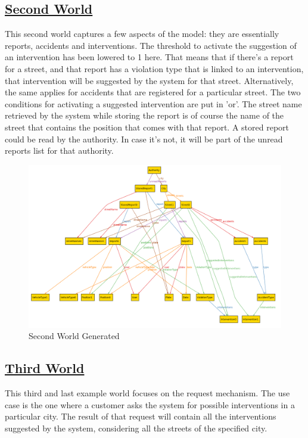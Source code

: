 	\subsection[Second World]{\hyperlink{toc}{Second World}}
	This second world captures a few aspects of the model: they are essentially reports, accidents and interventions. The threshold to activate the suggestion of an intervention has been lowered to 1 here. That means that if there's a report for a street, and that report has a violation type that is linked to an intervention, that intervention will be suggested by the system for that street. Alternatively, the same applies for accidents that are registered for a particular street. The two conditions for activating a suggested intervention are put in 'or'.
	The street name retrieved by the system while storing the report is of course the name of the street that contains the position that comes with that report.
	A stored report could be read by the authority. In case it's not, it will be part of the unread reports list for that authority.
	
	\begin{figure}[hbtp]
		\centering
		\includegraphics[scale=0.4, angle=90]{Files/alloy/world2.png}
		\caption{Second World Generated}
	\end{figure}
	
	\FloatBarrier
	\subsection[Third World]{\hyperlink{toc}{Third World}}
	This third and last example world focuses on the request mechanism. The use case is the one where a customer asks the system for possible interventions in a particular city. The result of that request will contain all the interventions suggested by the system, considering all the streets of the specified city.
	
